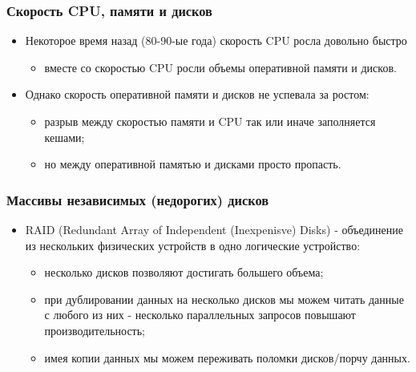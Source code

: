 \begin{frame}
\frametitle{Скорость CPU, памяти и дисков}
\begin{itemize}
  \item Некоторое время назад (80-90-ые года) скорость CPU росла довольно быстро
  \begin{itemize}
    \item вместе со скоростью CPU росли объемы оперативной памяти и дисков.
  \end{itemize}
  \item Однако скорость оперативной памяти и дисков не успевала за ростом:
  \begin{itemize}
    \item разрыв между скоростью памяти и CPU так или иначе заполняется кешами;
    \item но между оперативной памятью и дисками просто пропасть.
  \end{itemize}
\end{itemize}
\end{frame}

\begin{frame}
\frametitle{Массивы независимых (недорогих) дисков}
\begin{itemize}
  \item RAID (Redundant Array of Independent (Inexpenisve) Disks) - объединение
  из нескольких физических устройств в одно логические устройство:
  \begin{itemize}
    \item несколько дисков позволяют достигать большего объема;
    \item при дублировании данных на несколько дисков мы можем читать данные с
    любого из них - несколько параллельных запросов повышают производительность;
    \item имея копии данных мы можем переживать поломки дисков/порчу данных.
  \end{itemize}
\end{itemize}
\end{frame}

